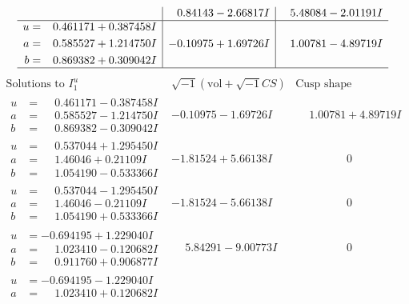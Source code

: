 \documentclass[1p]{elsarticle_modified}
\theoremstyle{definition}
\newcommand{\I}{\sqrt{-1}}
\begin{document}
$$\begin{array}{c|c|c}
 & \phantom{-}0.84143 - 2.66817 I & \phantom{-}5.48084 - 2.01191 I \\ \hline\begin{aligned}
u &= \phantom{-}0.461171 + 0.387458 I \\
a &= \phantom{-}0.585527 + 1.214750 I \\
b &= \phantom{-}0.869382 + 0.309042 I\end{aligned}
 & -0.10975 + 1.69726 I & \phantom{-}1.00781 - 4.89719 I\\
 \hline 
 \end{array}$$\newpage$$\begin{array}{c|c|c}  
\text{Solutions to }I^u_{1}& \I (\text{vol} + \sqrt{-1}CS) & \text{Cusp shape}\\
 \hline 
\begin{aligned}
u &= \phantom{-}0.461171 - 0.387458 I \\
a &= \phantom{-}0.585527 - 1.214750 I \\
b &= \phantom{-}0.869382 - 0.309042 I\end{aligned}
 & -0.10975 - 1.69726 I & \phantom{-}1.00781 + 4.89719 I \\ \hline\begin{aligned}
u &= \phantom{-}0.537044 + 1.295450 I \\
a &= \phantom{-}1.46046 + 0.21109 I \\
b &= \phantom{-}1.054190 - 0.533366 I\end{aligned}
 & -1.81524 + 5.66138 I & \phantom{-0.000000 } 0 \\ \hline\begin{aligned}
u &= \phantom{-}0.537044 - 1.295450 I \\
a &= \phantom{-}1.46046 - 0.21109 I \\
b &= \phantom{-}1.054190 + 0.533366 I\end{aligned}
 & -1.81524 - 5.66138 I & \phantom{-0.000000 } 0 \\ \hline\begin{aligned}
u &= -0.694195 + 1.229040 I \\
a &= \phantom{-}1.023410 - 0.120682 I \\
b &= \phantom{-}0.911760 + 0.906877 I\end{aligned}
 & \phantom{-}5.84291 - 9.00773 I & \phantom{-0.000000 } 0 \\ \hline\begin{aligned}
u &= -0.694195 - 1.229040 I \\
a &= \phantom{-}1.023410 + 0.120682 I \\

\end{aligned}
\end{array}$$
\end{document}

